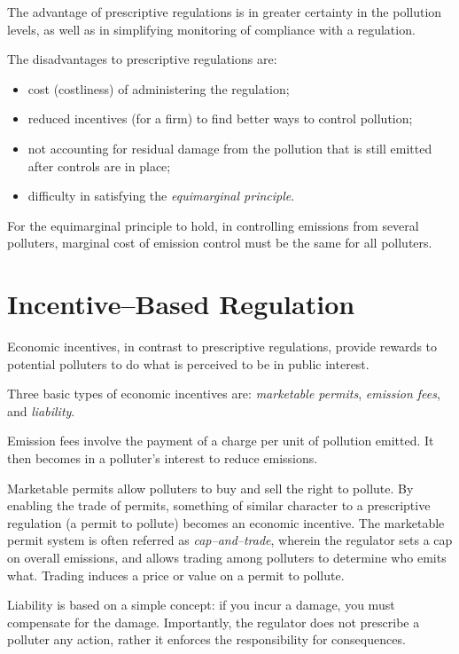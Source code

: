 \documentclass[
]{book}
\providecommand{\tightlist}{%
  \setlength{\itemsep}{0pt}\setlength{\parskip}{0pt}}
\begin{document}
The advantage of prescriptive regulations is in greater certainty in the pollution levels, as well as in simplifying monitoring of compliance with a regulation.

The disadvantages to prescriptive regulations are:

\begin{itemize}
\tightlist
\item
  cost (costliness) of administering the regulation;
\item
  reduced incentives (for a firm) to find better ways to control pollution;
\item
  not accounting for residual damage from the pollution that is still emitted after controls are in place;
\item
  difficulty in satisfying the \emph{equimarginal principle}.
\end{itemize}

For the equimarginal principle to hold, in controlling emissions from several polluters, marginal cost of emission control must be the same for all polluters.

\hypertarget{incentivebased-regulation}{%
\section{Incentive--Based Regulation}\label{incentivebased-regulation}}

Economic incentives, in contrast to prescriptive regulations, provide rewards to potential polluters to do what is perceived to be in public interest.

Three basic types of economic incentives are: \emph{marketable permits}, \emph{emission fees}, and \emph{liability}.

Emission fees involve the payment of a charge per unit of pollution emitted. It then becomes in a polluter's interest to reduce emissions.

Marketable permits allow polluters to buy and sell the right to pollute. By enabling the trade of permits, something of similar character to a prescriptive regulation (a permit to pollute) becomes an economic incentive. The marketable permit system is often referred as \emph{cap--and--trade}, wherein the regulator sets a cap on overall emissions, and allows trading among polluters to determine who emits what. Trading induces a price or value on a permit to pollute.

Liability is based on a simple concept: if you incur a damage, you must compensate for the damage. Importantly, the regulator does not prescribe a polluter any action, rather it enforces the responsibility for consequences.
\end{document}
